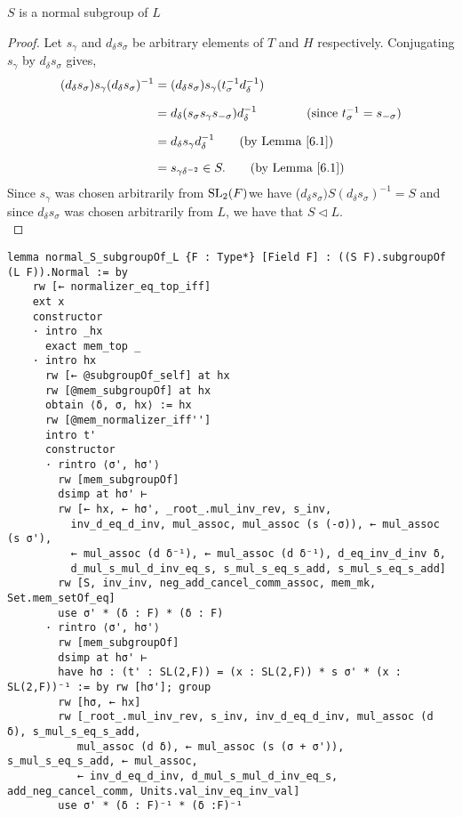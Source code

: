 \begin{lemma}
\label{SpecialSubgroups.normal_S_subgroupOf_L}
\leanok
$S$ is a normal subgroup of $L$
\end{lemma}
\begin{proof}
    \leanok
    Let $s_\gamma$ and $d_\delta s_\sigma$ be arbitrary elements of $T$ and $H$ respectively. Conjugating $s_\gamma$ by $d_\delta s_\sigma$ gives,
\begin{align*} (d_\delta s_\sigma) s_\gamma (d_\delta s_\sigma)^{-1} &= (d_\delta s_\sigma) s_\gamma (t^{-1}_\sigma d^{-1}_\delta) \\[1.5ex]
&=
d_\delta (s_\sigma s_\gamma s_{-\sigma}) d^{-1}_\delta \qquad \tag{since $t^{-1}_\sigma=s_{-\sigma}$} \\[1.5ex] 
&=
d_\delta s_\gamma d^{-1}_\delta \tag{by Lemma \ref{6.1}} \\[1.5ex] 
&= s_{\gamma \delta^{-2}} \in S. \tag{by Lemma \ref{6.1}}
\end{align*}
Since $s_\gamma$ was chosen arbitrarily from $\operatorname{SL}_2(F)$we have ($d_\delta s_\sigma) S (d_\delta s_\sigma)^{-1} = S$ and since $d_\delta s_\sigma$ was chosen arbitrarily from $L$, we have that $S \vartriangleleft L$. \\
\end{proof}
\begin{footnotesize}
\begin{verbatim}
lemma normal_S_subgroupOf_L {F : Type*} [Field F] : ((S F).subgroupOf (L F)).Normal := by
    rw [← normalizer_eq_top_iff]
    ext x
    constructor
    · intro _hx
      exact mem_top _
    · intro hx
      rw [← @subgroupOf_self] at hx
      rw [@mem_subgroupOf] at hx
      obtain ⟨δ, σ, hx⟩ := hx
      rw [@mem_normalizer_iff'']
      intro t'
      constructor
      · rintro ⟨σ', hσ'⟩
        rw [mem_subgroupOf]
        dsimp at hσ' ⊢
        rw [← hx, ← hσ', _root_.mul_inv_rev, s_inv,
          inv_d_eq_d_inv, mul_assoc, mul_assoc (s (-σ)), ← mul_assoc (s σ'),
          ← mul_assoc (d δ⁻¹), ← mul_assoc (d δ⁻¹), d_eq_inv_d_inv δ,
          d_mul_s_mul_d_inv_eq_s, s_mul_s_eq_s_add, s_mul_s_eq_s_add]
        rw [S, inv_inv, neg_add_cancel_comm_assoc, mem_mk, Set.mem_setOf_eq]
        use σ' * (δ : F) * (δ : F)
      · rintro ⟨σ', hσ'⟩
        rw [mem_subgroupOf]
        dsimp at hσ' ⊢
        have hσ : (t' : SL(2,F)) = (x : SL(2,F)) * s σ' * (x : SL(2,F))⁻¹ := by rw [hσ']; group
        rw [hσ, ← hx]
        rw [_root_.mul_inv_rev, s_inv, inv_d_eq_d_inv, mul_assoc (d δ), s_mul_s_eq_s_add,
           mul_assoc (d δ), ← mul_assoc (s (σ + σ')), s_mul_s_eq_s_add, ← mul_assoc,
           ← inv_d_eq_d_inv, d_mul_s_mul_d_inv_eq_s, add_neg_cancel_comm, Units.val_inv_eq_inv_val]
        use σ' * (δ : F)⁻¹ * (δ :F)⁻¹
\end{verbatim}
\end{footnotesize}


